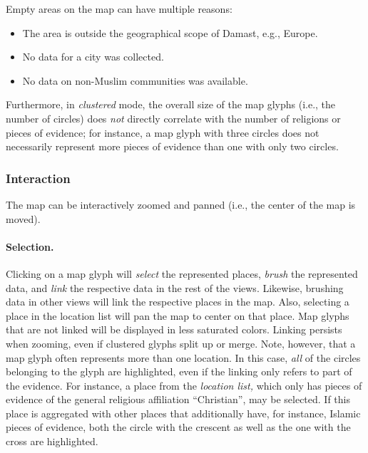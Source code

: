 Empty areas on the map can have multiple reasons:

\begin{itemize}
  \item The area is outside the geographical scope of Damast, e.g., Europe.
  \item No data for a city was collected.
  \item No data on non-Muslim communities was available.
\end{itemize}

Furthermore, in \emph{clustered} mode, the overall size of the map glyphs (i.e., the number of circles) does \emph{not} directly correlate with the number of religions or pieces of evidence;
for instance, a map glyph with three circles does not necessarily represent more pieces of evidence than one with only two circles.


\subsubsection{Interaction}

The map can be interactively zoomed and panned (i.e., the center of the map is moved).

\paragraph{Selection.}
\label{sec:map-glyph-selection}
Clicking on a map glyph will \emph{select} the represented places, \emph{brush} the represented data, and \emph{link} the respective data in the rest of the views.
Likewise, brushing data in other views will link the respective places in the map.
Also, selecting a place in the location list will pan the map to center on that place.
Map glyphs that are not linked will be displayed in less saturated colors.
Linking persists when zooming, even if clustered glyphs split up or merge.
Note, however, that a map glyph often represents more than one location.
In this case, \emph{all} of the circles belonging to the glyph are highlighted, even if the linking only refers to part of the evidence.
For instance, a place from the \emph{location list,} which only has pieces of evidence of the general religious affiliation \enquote{Christian}, may be selected.
If this place is aggregated with other places that additionally have, for instance, Islamic pieces of evidence, both the circle with the crescent as well as the one with the cross are highlighted.

